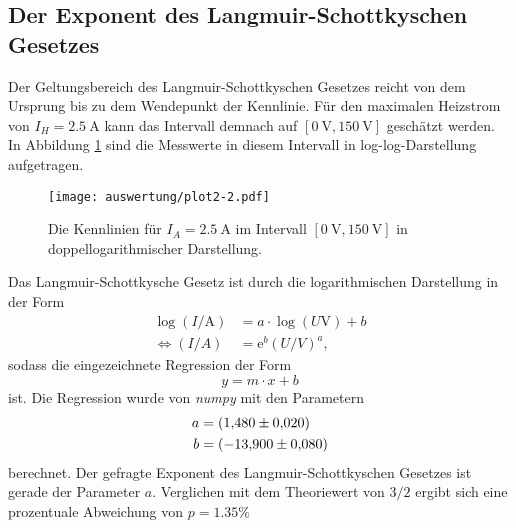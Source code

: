 \subsection{Der Exponent des Langmuir-Schottkyschen Gesetzes}
\label{sec:langschott}
Der Geltungsbereich des Langmuir-Schottkyschen Gesetzes reicht von dem Ursprung bis zu dem Wendepunkt der Kennlinie. Für den maximalen Heizstrom
von $I_H=\SI{2.5}{\ampere}$ kann das Intervall demnach auf $[\SI{0}{\volt}, \SI{150}{\volt}]$ geschätzt werden. In Abbildung \ref{fig:plot2} sind 
die Messwerte in diesem Intervall in log-log-Darstellung aufgetragen. 
\begin{figure}[H]
    \centering
    \texttt{[image: auswertung/plot2-2.pdf]}
    \caption{Die Kennlinien für $I_A=\SI{2.5}{\ampere}$ im Intervall $[\SI{0}{\volt}, \SI{150}{\volt}]$ in doppellogarithmischer Darstellung.}
    \label{fig:plot2}
\end{figure}
\noindent
Das Langmuir-Schottkysche Gesetz ist durch die logarithmischen Darstellung in der Form 
\begin{align*}
    \log(I/\si{\ampere})&=a\cdot \log(U\si{\volt})+b\\
    \Leftrightarrow
    (I/A)&=\text{e}^b(U/V)^{a},  %
\end{align*}
sodass die eingezeichnete Regression der Form 
\begin{equation}
    y=m\cdot x+b
    \label{eqn:gerade}
\end{equation}
ist. Die Regression wurde von \textit{numpy} \cite{numpy} mit den Parametern
\begin{align*}
    a &= \SI{1.48   \pm 0.020}{} \\
    b &= \SI{-13.90 \pm 0.080}{} 
\end{align*}
berechnet. Der gefragte Exponent des Langmuir-Schottkyschen Gesetzes ist gerade der Parameter $a$. Verglichen mit dem Theoriewert von $3/2$ 
ergibt sich eine prozentuale Abweichung von $p=\num{1.35}\%$

